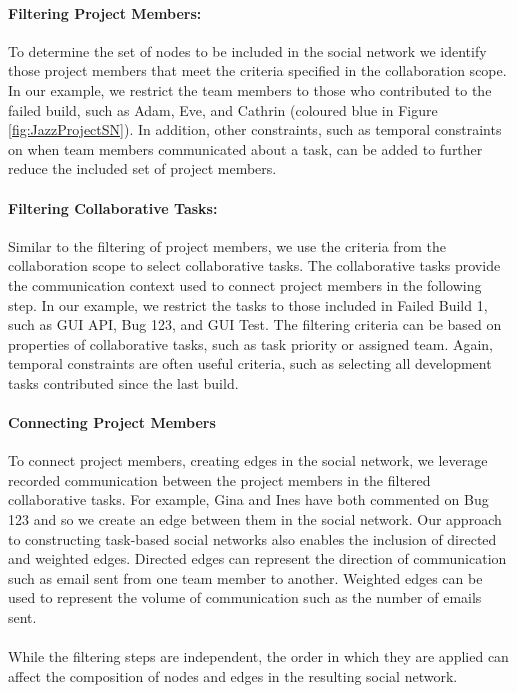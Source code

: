 \documentclass[12pt,oneside]{book}
\newcommand{\cu}{collaborative task}
\newcommand{\people}{project member}
\begin{document}
\paragraph{Filtering Project Members:}
To determine the set of nodes to be included in the social network we identify
those \people s that meet the criteria specified in the collaboration scope. In
our example, we restrict the team members to those who contributed to the failed
build, such as Adam, Eve, and Cathrin (coloured blue in Figure
\ref{fig:JazzProjectSN}). In addition, other constraints, such as temporal
constraints on when team members communicated about a task, can be added to
further reduce the included set of \people s.

\paragraph{Filtering Collaborative Tasks:}
Similar to the filtering of \people s, we use the criteria from the collaboration
scope to select \cu s. The \cu s provide the communication context used to
connect \people s in the following step. In our example, we restrict the tasks to
those included in Failed Build 1, such as GUI API, Bug 123, and GUI Test. The
filtering criteria can be based on properties of \cu s, such as task priority or
assigned team. Again, temporal constraints are often useful criteria, such as
selecting all development tasks contributed since the last build.

\paragraph{Connecting Project Members}
To connect \people s, creating edges in the social network, we leverage recorded
communication between the \people s in the filtered \cu s. For example, Gina and
Ines have both commented on Bug 123 and so we create an edge between them in the
social network. Our approach to constructing task-based social networks also
enables the inclusion of directed and weighted edges. Directed edges can
represent the direction of communication such as email sent from one team member
to another. Weighted edges can be used to represent the volume of communication
such as the number of emails sent.

\paragraph{}
While the filtering steps are independent, the order in which they are applied
can affect the composition of nodes and edges in the resulting social network.
\end{document}
